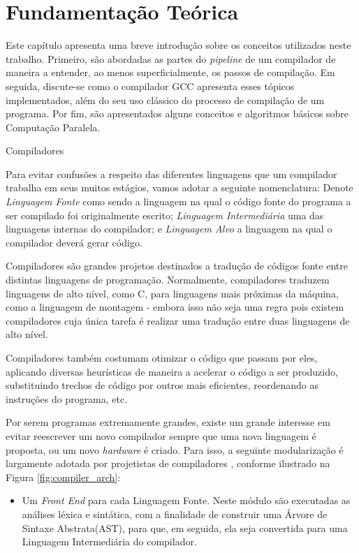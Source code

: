 \chapter{Fundamentação Teórica}
\label{chap:fundamentacao}

Este capítulo apresenta uma breve introdução sobre os conceitos utilizados neste
trabalho. Primeiro, são abordadas as partes do \textit{pipeline} de um compilador
de maneira a entender, ao menos superficialmente, os passos de compilação.
Em seguida, discute-se como o compilador GCC apresenta esses tópicos implementados,
além do seu uso clássico do processo de compilação de um programa. Por fim, são
apresentados alguns conceitos e algoritmos básicos sobre Computação Paralela.

\begin{section}{Compiladores}

Para evitar confusões a respeito das diferentes linguagens que um compilador
trabalha em seus muitos estágios, vamos adotar a seguinte nomenclatura:
Denote \textit{Linguagem Fonte} como sendo a linguagem
na qual o código fonte do programa a ser compilado foi originalmente escrito;
\textit{Linguagem Intermediária} uma das linguagens internas do compilador; e
\textit{Linguagem Alvo} a linguagem na qual o compilador deverá gerar código.

Compiladores são grandes projetos destinados a tradução de códigos fonte
entre distintas linguagens de programação. Normalmente, compiladores traduzem
linguagens de alto nível, como C, para linguagens mais próximas da máquina,
como a linguagem de montagem - embora isso não seja uma regra pois existem
compiladores cuja única tarefa é realizar uma tradução entre duas linguagens
de alto nível.

Compiladores também costumam otimizar
o código que passam por eles, aplicando diversas heurísticas de
maneira a acelerar o código a ser produzido, substituindo trechos de código por
outros mais eficientes, reordenando as instruções do programa, etc.

Por serem programas extremamente grandes, existe um grande interesse em evitar
reescrever um novo compilador
sempre que uma nova linguagem é proposta, ou um novo \textit{hardware} é criado.
Para isso, a seguinte modularização é largamente adotada por projetistas de
compiladores \citep{redhat} \citep{llvm}, conforme ilustrado na Figura \ref{fig:compiler_arch}:

\begin{itemize}
    \item Um \textit{Front End} para cada Linguagem Fonte.
	Neste módulo são executadas as análises léxica e sintática, com a
        finalidade de construir uma Árvore de Sintaxe Abstrata(AST), para que, em
seguida, ela seja convertida para uma Linguagem Intermediária do compilador.


\end{itemize}
\end{section}
